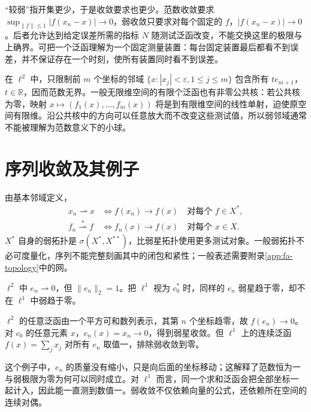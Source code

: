 \documentclass[UTF8,12pt,a4paper,fontset=fandol]{ctexbook}
\begin{document}
“较弱”指开集更少，于是收敛要求也更少。范数收敛要求 $\sup_{\|f\|\leq1}|f(x_n-x)|\to0$，弱收敛只要求对每个固定的 $f$，$|f(x_n-x)|\to0$。后者允许达到给定误差所需的指标 $N$ 随测试泛函改变，不能交换这里的极限与上确界。可把一个泛函理解为一个固定测量装置：每台固定装置最后都看不到误差，并不保证存在一个时刻，使所有装置同时看不到误差。

在 $\ell^2$ 中，只限制前 $m$ 个坐标的邻域 $\{x:|x_j|<\varepsilon,1\leq j\leq m\}$ 包含所有 $te_{m+1}$，$t\in\mathbb R$，因而范数无界。一般无限维空间的有限个泛函也有非零公共核：若公共核为零，映射 $x\mapsto(f_1(x),\ldots,f_m(x))$ 将是到有限维空间的线性单射，迫使原空间有限维。沿公共核中的方向可以任意放大而不改变这些测试值，所以弱邻域通常不能被理解为范数意义下的小球。

\section{序列收敛及其例子}
由基本邻域定义，
\begin{align}
 x_n\rightharpoonup x
 &\iff f(x_n)\to f(x)\quad\text{对每个 }f\in X^*,
 \label{eq:fa-weak-convergence}\\
 f_n\overset{*}{\rightharpoonup}f
 &\iff f_n(x)\to f(x)\quad\text{对每个 }x\in X.
 \label{eq:fa-weak-star-convergence}
\end{align}
$X^*$ 自身的弱拓扑是 $\sigma(X^*,X^{**})$，比弱星拓扑使用更多测试对象。一般弱拓扑不必可度量化，序列不能完整刻画其中的闭包和紧性；一般表述需要附录\ref{app:fa-topology}中的网。

\begin{example}\label{ex:fa-weak-unit-vectors}
$\ell^2$ 中 $e_n\rightharpoonup0$，但 $\|e_n\|_2=1$。把 $\ell^1$ 视为 $c_0^*$ 时，同样的 $e_n$ 弱星趋于零，却不在 $\ell^1$ 中弱趋于零。
\end{example}
\begin{solve}
$\ell^2$ 的任意泛函由一个平方可和数列表示，其第 $n$ 个坐标趋零，故 $f(e_n)\to0$。对 $c_0$ 的任意元素 $x$，$e_n(x)=x_n\to0$，得到弱星收敛。但 $\ell^1$ 上的连续泛函 $f(x)=\sum_jx_j$ 对所有 $e_n$ 取值一，排除弱收敛到零。
\end{solve}

这个例子中，$e_n$ 的质量没有缩小，只是向后面的坐标移动；这解释了范数恒为一与弱极限为零为何可以同时成立。对 $\ell^1$ 而言，同一个求和泛函会把全部坐标一起计入，因此能一直测到数值一。弱收敛不仅依赖向量的公式，还依赖所在空间的连续对偶。
\end{document}
